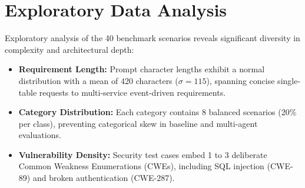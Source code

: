 \section{Exploratory Data Analysis}
Exploratory analysis of the 40 benchmark scenarios reveals significant diversity in complexity and architectural depth:
\begin{itemize}
    \item \textbf{Requirement Length:} Prompt character lengths exhibit a normal distribution with a mean of 420 characters ($\sigma = 115$), spanning concise single-table requests to multi-service event-driven requirements.
    \item \textbf{Category Distribution:} Each category contains 8 balanced scenarios (20\% per class), preventing categorical skew in baseline and multi-agent evaluations.
    \item \textbf{Vulnerability Density:} Security test cases embed 1 to 3 deliberate Common Weakness Enumerations (CWEs), including SQL injection (CWE-89) and broken authentication (CWE-287).
\end{itemize}
